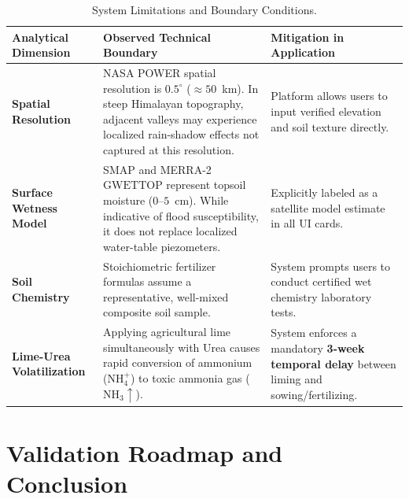 \documentclass[11pt,a4paper]{report}
\begin{document}
\begin{table}[htbp]
\centering
\small
\caption{System Limitations and Boundary Conditions.}
\label{tab:limitations}
\begin{tabularx}{\textwidth}{p{3.5cm}Xp{4.2cm}}
\toprule
\textbf{Analytical Dimension} & \textbf{Observed Technical Boundary} & \textbf{Mitigation in Application} \\
\midrule
\textbf{Spatial Resolution} & NASA POWER spatial resolution is $0.5^\circ$ ($\approx 50$~km). In steep Himalayan topography, adjacent valleys may experience localized rain-shadow effects not captured at this resolution. & Platform allows users to input verified elevation and soil texture directly. \\
\textbf{Surface Wetness Model} & SMAP and MERRA-2 $\text{GWETTOP}$ represent topsoil moisture ($0$--$5$~cm). While indicative of flood susceptibility, it does not replace localized water-table piezometers. & Explicitly labeled as a satellite model estimate in all UI cards. \\
\textbf{Soil Chemistry} & Stoichiometric fertilizer formulas assume a representative, well-mixed composite soil sample. & System prompts users to conduct certified wet chemistry laboratory tests. \\
\textbf{Lime-Urea Volatilization} & Applying agricultural lime simultaneously with Urea causes rapid conversion of ammonium ($\text{NH}_4^+$) to toxic ammonia gas ($\text{NH}_3\uparrow$). & System enforces a mandatory \textbf{3-week temporal delay} between liming and sowing/fertilizing. \\
\bottomrule
\end{tabularx}
\end{table}

\chapter{Validation Roadmap and Conclusion}
\end{document}
